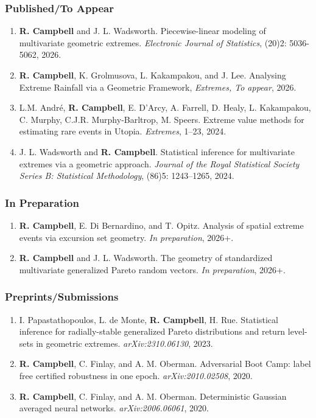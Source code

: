 \documentclass[11pt]{scrartcl}
\begin{document}
\subsubsection*{Published/To Appear}
\begin{enumerate}[leftmargin=*,nosep]
    \item \textbf{R. Campbell} and J. L. Wadsworth. Piecewise-linear modeling of multivariate geometric extremes. \emph{Electronic Journal of Statistics}, (20)2: 5036-5062, 2026.
    \item \textbf{R. Campbell}, K. Grolmusova, L. Kakampakou, and J. Lee. Analysing Extreme Rainfall via a Geometric Framework, \emph{Extremes, To appear}, 2026.
    \item L.M. André, \textbf{R. Campbell}, E. D'Arcy, A. Farrell, D. Healy, L. Kakampakou, C. Murphy, C.J.R. Murphy-Barltrop, M. Speers. Extreme value methods for estimating rare events in Utopia. \emph{Extremes}, 1--23, 2024.
    \item J. L. Wadsworth and \textbf{R. Campbell}. Statistical inference for multivariate extremes via a geometric approach. \emph{Journal of the Royal Statistical Society Series B: Statistical Methodology}, (86)5: 1243--1265, 2024.
\end{enumerate}

\subsubsection*{In Preparation}
\begin{enumerate}[leftmargin=*,nosep]
    \item \textbf{R. Campbell}, E. Di Bernardino, and T. Opitz. Analysis of spatial extreme events via excursion set geometry. \emph{In preparation}, 2026+.
    \item \textbf{R. Campbell} and J. L. Wadsworth. The geometry of standardized multivariate generalized Pareto random vectors. \emph{In preparation}, 2026+.
\end{enumerate}

\subsubsection*{Preprints/Submissions}
\begin{enumerate}[leftmargin=*,nosep]
    \item I. Papastathopoulos, L. de Monte, \textbf{R. Campbell}, H. Rue. Statistical inference for radially-stable generalized Pareto distributions and return level-sets in geometric extremes. \emph{arXiv:2310.06130}, 2023.
    \item \textbf{R. Campbell}, C. Finlay, and A. M. Oberman. Adversarial Boot Camp: label free certified robustness in one epoch. \emph{arXiv:2010.02508}, 2020.
    \item \textbf{R. Campbell}, C. Finlay, and A. M. Oberman. Deterministic Gaussian averaged neural networks. \emph{arXiv:2006.06061}, 2020.
\end{enumerate}
\end{document}

